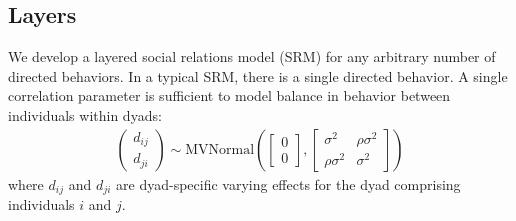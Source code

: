 \documentclass[reqno ,12pt]{amsart}
\begin{document}
\subsection{Layers}

We develop a layered social relations model (SRM) for any arbitrary number of directed behaviors. In a typical SRM, there is a single directed behavior. A single correlation parameter is sufficient to model balance in behavior between individuals within dyads:
\begin{align*}
	\begin{pmatrix}d_{ij} \\ d_{ji}\end{pmatrix} \sim \text{MVNormal} \left( \begin{bmatrix} 0 \\ 0 \end{bmatrix} , 
	\begin{bmatrix} \sigma^2 & \rho \sigma^2 \\ \rho \sigma^2 & \sigma^2 \end{bmatrix}
	 \right)
\end{align*}
where $d_{ij}$ and $d_{ji}$ are dyad-specific varying effects for the dyad comprising individuals $i$ and $j$. 
\end{document}
